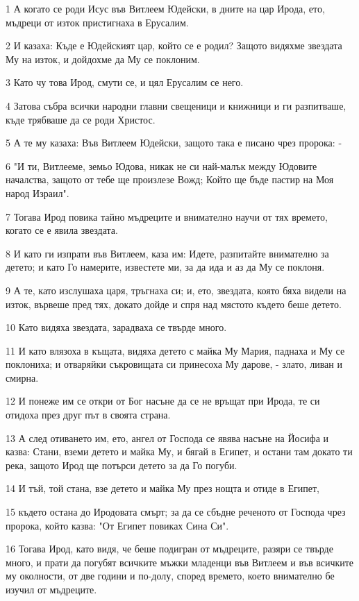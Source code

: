 \par 1 А когато се роди Исус във Витлеем Юдейски, в дните на цар Ирода, ето, мъдреци от изток пристигнаха в Ерусалим.
\par 2 И казаха: Къде е Юдейският цар, който се е родил? Защото видяхме звездата Му на изток, и дойдохме да Му се поклоним.
\par 3 Като чу това Ирод, смути се, и цял Ерусалим се него.
\par 4 Затова събра всички народни главни свещеници и книжници и ги разпитваше, къде трябваше да се роди Христос.
\par 5 А те му казаха: Във Витлеем Юдейски, защото така е писано чрез пророка: -
\par 6 "И ти, Витлееме, земьо Юдова, никак не си най-малък между Юдовите началства, защото от тебе ще произлезе Вожд; Който ще бъде пастир на Моя народ Израил".
\par 7 Тогава Ирод повика тайно мъдреците и внимателно научи от тях времето, когато се е явила звездата.
\par 8 И като ги изпрати във Витлеем, каза им: Идете, разпитайте внимателно за детето; и като Го намерите, известете ми, за да ида и аз да Му се поклоня.
\par 9 А те, като изслушаха царя, тръгнаха си; и, ето, звездата, която бяха видели на изток, вървеше пред тях, докато дойде и спря над мястото където беше детето.
\par 10 Като видяха звездата, зарадваха се твърде много.
\par 11 И като влязоха в къщата, видяха детето с майка Му Мария, паднаха и Му се поклониха; и отваряйки съкровищата си принесоха Му дарове, - злато, ливан и смирна.
\par 12 И понеже им се откри от Бог насъне да се не връщат при Ирода, те си отидоха през друг път в своята страна.
\par 13 А след отиването им, ето, ангел от Господа се явява насъне на Йосифа и казва: Стани, вземи детето и майка Му, и бягай в Египет, и остани там докато ти река, защото Ирод ще потърси детето за да Го погуби.
\par 14 И тъй, той стана, взе детето и майка Му през нощта и отиде в Египет,
\par 15 където остана до Иродовата смърт; за да се сбъдне реченото от Господа чрез пророка, който казва: "От Египет повиках Сина Си".
\par 16 Тогава Ирод, като видя, че беше подигран от мъдреците, разяри се твърде много, и прати да погубят всичките мъжки младенци във Витлеем и във всичките му околности, от две години и по-долу, според времето, което внимателно бе изучил от мъдреците.
